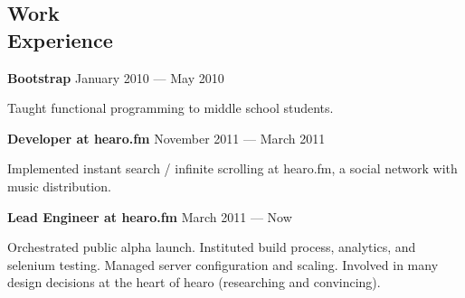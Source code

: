 \documentclass[margin,line]{resume}
\begin{document}
\begin{resume}


    \section{\mysidestyle{} Work\\Experience}

    \textbf{Bootstrap}  \hfill January 2010 — May 2010  \par\vspace{-4.0mm}   
     {\addtolength{\leftskip}{2 mm}
  Taught functional programming to middle school students.
      \par}
    
    \textbf{Developer at hearo.fm}  \hfill November 2011 — March 2011   \par\vspace{-4.0mm} 
     {\addtolength{\leftskip}{2 mm}
       Implemented instant search / infinite scrolling at hearo.fm, a social network with music distribution.
       \par}
       
    \textbf{Lead Engineer at hearo.fm} \hfill March 2011 — Now      \par\vspace{-4.0mm}
          {\addtolength{\leftskip}{2 mm}
          Orchestrated public alpha launch. Instituted build process, analytics, and selenium testing. Managed server configuration and scaling. Involved in many design decisions at the heart of hearo (researching and convincing).
      \par}


\end{resume}
\end{document}
